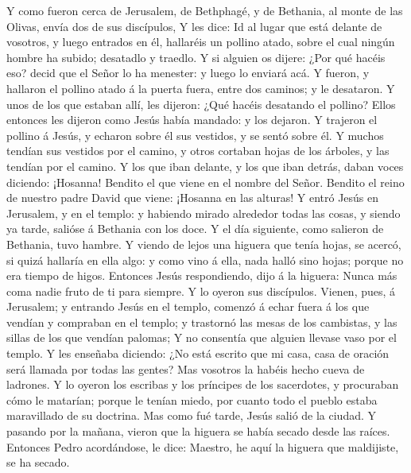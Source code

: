  Y como fueron cerca de Jerusalem, de Bethphagé, y de
Bethania, al monte de las Olivas, envía dos de sus discípulos,
 Y les dice: Id al lugar que está delante de vosotros, y
luego entrados en él, hallaréis un pollino atado, sobre el cual ningún
hombre ha subido; desatadlo y traedlo.  Y si alguien os
dijere: ¿Por qué hacéis eso? decid que el Señor lo ha menester: y luego
lo enviará acá.  Y fueron, y hallaron el pollino atado á
la puerta fuera, entre dos caminos; y le desataron.  Y
unos de los que estaban allí, les dijeron: ¿Qué hacéis desatando el
pollino?  Ellos entonces les dijeron como Jesús había
mandado: y los dejaron.  Y trajeron el pollino á Jesús, y
echaron sobre él sus vestidos, y se sentó sobre él.  Y
muchos tendían sus vestidos por el camino, y otros cortaban hojas de los
árboles, y las tendían por el camino.  Y los que iban
delante, y los que iban detrás, daban voces diciendo: ¡Hosanna! Bendito
el que viene en el nombre del Señor.  Bendito el reino de
nuestro padre David que viene: ¡Hosanna en las alturas! 
Y entró Jesús en Jerusalem, y en el templo: y habiendo mirado alrededor
todas las cosas, y siendo ya tarde, salióse á Bethania con los doce.
 Y el día siguiente, como salieron de Bethania, tuvo
hambre.  Y viendo de lejos una higuera que tenía hojas,
se acercó, si quizá hallaría en ella algo: y como vino á ella, nada
halló sino hojas; porque no era tiempo de higos. 
Entonces Jesús respondiendo, dijo á la higuera: Nunca más coma nadie
fruto de ti para siempre. Y lo oyeron sus discípulos. 
Vienen, pues, á Jerusalem; y entrando Jesús en el templo, comenzó á
echar fuera á los que vendían y compraban en el templo; y trastornó las
mesas de los cambistas, y las sillas de los que vendían palomas;
 Y no consentía que alguien llevase vaso por el templo.
 Y les enseñaba diciendo: ¿No está escrito que mi casa,
casa de oración será llamada por todas las gentes? Mas vosotros la
habéis hecho cueva de ladrones.  Y lo oyeron los escribas
y los príncipes de los sacerdotes, y procuraban cómo le matarían; porque
le tenían miedo, por cuanto todo el pueblo estaba maravillado de su
doctrina.  Mas como fué tarde, Jesús salió de la ciudad.
 Y pasando por la mañana, vieron que la higuera se había
secado desde las raíces.  Entonces Pedro acordándose, le
dice: Maestro, he aquí la higuera que maldijiste, se ha secado.
